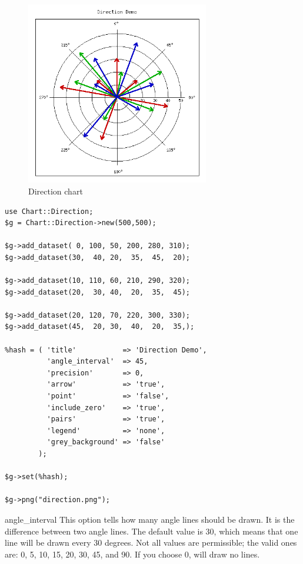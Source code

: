 \example
\begin{figure}[ht]
  \begin{center}
    \includegraphics[width = 8cm, height =8cm]{direction.png}
  \end{center}
  \caption{Direction chart}
  \label{fig:direction}
\end{figure}
\begin{verbatim}
use Chart::Direction;
$g = Chart::Direction->new(500,500);

$g->add_dataset( 0, 100, 50, 200, 280, 310);
$g->add_dataset(30,  40, 20,  35,  45,  20);

$g->add_dataset(10, 110, 60, 210, 290, 320);
$g->add_dataset(20,  30, 40,  20,  35,  45);

$g->add_dataset(20, 120, 70, 220, 300, 330);
$g->add_dataset(45,  20, 30,  40,  20,  35,);

%hash = ( 'title'           => 'Direction Demo',
          'angle_interval'  => 45,
          'precision'       => 0,
          'arrow'           => 'true',
          'point'           => 'false',
          'include_zero'    => 'true',
          'pairs'           => 'true',
          'legend'          => 'none',
          'grey_background' => 'false'
        );

$g->set(%hash);

$g->png("direction.png");
\end{verbatim}

\constructorblurb{\thisname}

\begin{AttrDecl}{angle\_interval}
This option tells \thisclass how many angle lines should be drawn. It is
the difference between two angle lines. The default value is 30, which
means that one line will be drawn every 30 degrees. Not all values are
permissible; the valid ones are: 0, 5, 10, 15, 20, 30, 45, and 90. If
you choose 0, \thisclass will draw no lines.
\end{AttrDecl}


